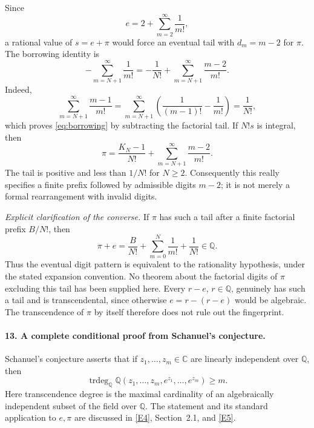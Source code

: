 \documentclass[11pt]{article}
\newcommand{\Q}{\mathbb Q}
\newcommand{\C}{\mathbb C}
\DeclareMathOperator{\trdeg}{trdeg}
\begin{document}
Since
\[
 e=2+\sum_{m=2}^{\infty}\frac1{m!},
\]
a rational value of $s=e+\pi$ would force an eventual tail with
$d_m=m-2$ for $\pi$. The borrowing identity is
\begin{equation}\label{eq:borrowing}
 -\sum_{m=N+1}^{\infty}\frac1{m!}
 =-\frac1{N!}+\sum_{m=N+1}^{\infty}\frac{m-2}{m!}.
\end{equation}
Indeed,
\[
 \sum_{m=N+1}^{\infty}\frac{m-1}{m!}
 =\sum_{m=N+1}^{\infty}
   \left(\frac1{(m-1)!}-\frac1{m!}\right)=\frac1{N!},
\]
which proves \eqref{eq:borrowing} by subtracting the factorial tail.
If $N!s$ is integral, then
\begin{equation}\label{eq:digit-tail}
 \pi=\frac{K_N-1}{N!}
       +\sum_{m=N+1}^{\infty}\frac{m-2}{m!}.
\end{equation}
The tail is positive and less than $1/N!$ for $N\ge2$. Consequently this
really specifies a finite prefix followed by admissible digits $m-2$;
it is not merely a formal rearrangement with invalid digits.

\textit{Explicit clarification of the converse.}
If $\pi$ has such a tail after a finite factorial prefix $B/N!$, then
\[
 \pi+e=\frac B{N!}+\sum_{m=0}^{N}\frac1{m!}+\frac1{N!}\in\Q.
\]
Thus the eventual digit pattern is equivalent to the rationality
hypothesis, under the stated expansion convention. No theorem about the
factorial digits of $\pi$ excluding this tail has been supplied here.
Every $r-e$, $r\in\Q$, genuinely has such a tail and is transcendental,
since otherwise $e=r-(r-e)$ would be algebraic. The transcendence of
$\pi$ by itself therefore does not rule out the fingerprint.

\paragraph{13. A complete conditional proof from Schanuel's conjecture.}
Schanuel's conjecture asserts that if $z_1,\ldots,z_m\in\C$ are linearly
independent over $\Q$, then
\begin{equation}\label{eq:schanuel}
 \trdeg_{\Q}\Q(z_1,\ldots,z_m,e^{z_1},\ldots,e^{z_m})\ge m.
\end{equation}
Here transcendence degree is the maximal cardinality of an algebraically
independent subset of the field over $\Q$. The statement and its standard
application to $e,\pi$ are discussed in
\href{https://arxiv.org/html/2403.09304v1}{[E4]}, Section~2.1, and
\href{https://webusers.imj-prg.fr/~michel.waldschmidt/articles/pdf/ColloquiumDeGiorgiSchanuelConjecture2014.pdf}{[E5]}.
\end{document}
